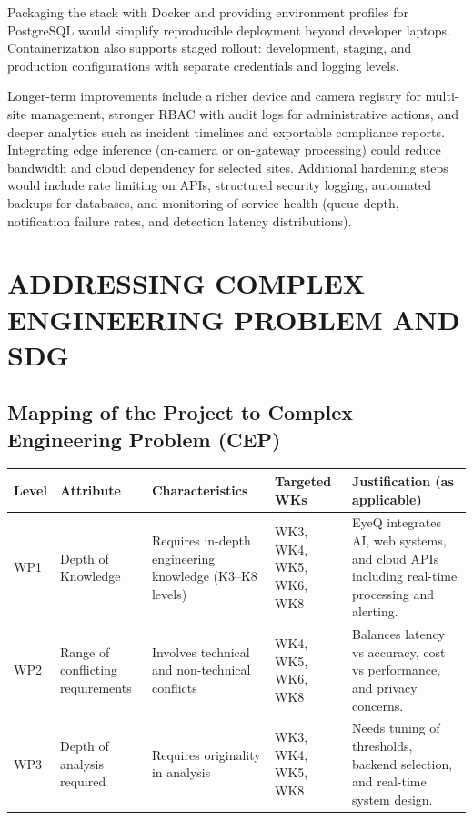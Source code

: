 \documentclass[10pt,openany]{report}
\begin{document}
\begin{sloppypar}
{{{\begin{sloppypar}
Packaging the stack with Docker and providing environment profiles for PostgreSQL would simplify reproducible deployment beyond developer laptops. Containerization also supports staged rollout: development, staging, and production configurations with separate credentials and logging levels.

Longer-term improvements include a richer device and camera registry for multi-site management, stronger RBAC with audit logs for administrative actions, and deeper analytics such as incident timelines and exportable compliance reports. Integrating edge inference (on-camera or on-gateway processing) could reduce bandwidth and cloud dependency for selected sites. Additional hardening steps would include rate limiting on APIs, structured security logging, automated backups for databases, and monitoring of service health (queue depth, notification failure rates, and detection latency distributions).

\chapter{ADDRESSING COMPLEX ENGINEERING PROBLEM AND SDG}

\section{Mapping of the Project to Complex Engineering Problem (CEP)}

\begin{table}[H]
\centering
\renewcommand{\arraystretch}{1.2}
\setlength{\tabcolsep}{3pt}

\begin{tabular}{|p{1.2cm}|p{3cm}|p{4cm}|p{2.5cm}|p{4.5cm}|}
\hline
\textbf{Level} & \textbf{Attribute} & \textbf{Characteristics} & \textbf{Targeted WKs} & \textbf{Justification (as applicable)} \\
\hline

WP1 & Depth of Knowledge &
Requires in-depth engineering knowledge (K3--K8 levels) &
WK3, WK4, WK5, WK6, WK8 &
EyeQ integrates AI, web systems, and cloud APIs including real-time processing and alerting. \\
\hline

WP2 & Range of conflicting requirements &
Involves technical and non-technical conflicts &
WK4, WK5, WK6, WK8 &
Balances latency vs accuracy, cost vs performance, and privacy concerns. \\
\hline

WP3 & Depth of analysis required &
Requires originality in analysis &
WK3, WK4, WK5, WK8 &
Needs tuning of thresholds, backend selection, and real-time system design. \\
\hline


\end{tabular}
\end{table}
\end{sloppypar}}}}
\end{sloppypar}
\end{document}
